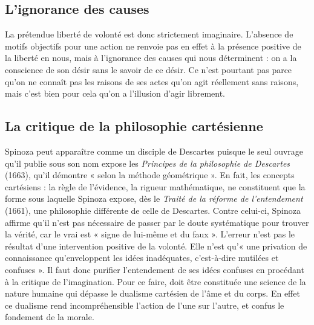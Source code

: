 \subsection{L’ignorance des causes}

La prétendue liberté de volonté est donc strictement imaginaire. L'absence de
motifs objectifs pour une action ne renvoie pas en effet à la présence positive de
la liberté en nous, mais à l'ignorance des causes qui nous déterminent : on a la
conscience de son désir sans le savoir de ce désir. Ce n’est pourtant pas parce
qu'on ne connaît pas les raisons de ses actes qu’on agit réellement sans raisons,
mais c’est bien pour cela qu'on a l'illusion d'agir librement.

\subsection{La critique de la philosophie cartésienne}

Spinoza peut apparaître comme un disciple de Descartes puisque le seul ouvrage
qu’il publie sous son nom expose les {\it Principes de la philosophie de Descartes}
(1663), qu'il démontre « selon la méthode géométrique ». En fait, les concepts
cartésiens : la règle de l’évidence, la rigueur mathématique, ne constituent que la
forme sous laquelle Spinoza expose, dès le {\it Traité de la réforme de l’entendement}
(1661), une philosophie différente de celle de Descartes. Contre celui-ci, Spinoza
affirme qu'il n’est pas nécessaire de passer par le doute systématique pour trouver
la vérité, car le vrai est « signe de lui-même et du faux ». L'erreur n’est pas le
résultat d’une intervention positive de la volonté. Elle n’est qu’« une privation de
connaissance qu'enveloppent les idées inadéquates, c'est-à-dire mutilées et
confuses ». Il faut donc purifier l’entendement de ses idées confuses en procédant
à la critique de l'imagination. Pour ce faire, doit être constituée une science de la
nature humaine qui dépasse le dualisme cartésien de l’âme et du corps. En effet
ce dualisme rend incompréhensible l’action de l’une sur l’autre, et confus le fondement de la morale.
